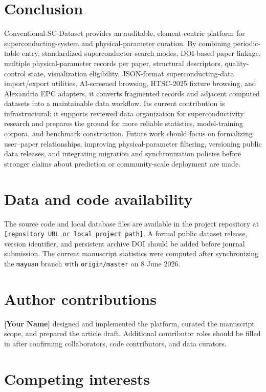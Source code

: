 \documentclass[11pt,a4paper]{article}
\begin{document}
\section{Conclusion}

Conventional-SC-Dataset provides an auditable, element-centric platform for superconducting-system and physical-parameter curation. By combining periodic-table entry, standardized superconductor-search modes, DOI-based paper linkage, multiple physical-parameter records per paper, structural descriptors, quality-control state, visualization eligibility, JSON-format superconducting-data import/export utilities, AI-screened browsing, HTSC-2025 fixture browsing, and Alexandria EPC adapters, it converts fragmented records and adjacent computed datasets into a maintainable data workflow. Its current contribution is infrastructural: it supports reviewed data organization for superconductivity research and prepares the ground for more reliable statistics, model-training corpora, and benchmark construction. Future work should focus on formalizing user--paper relationships, improving physical-parameter filtering, versioning public data releases, and integrating migration and synchronization policies before stronger claims about prediction or community-scale deployment are made.

\section*{Data and code availability}

The source code and local database files are available in the project repository at \texttt{[repository URL or local project path]}. A formal public dataset release, version identifier, and persistent archive DOI should be added before journal submission. The current manuscript statistics were computed after synchronizing the \texttt{mayuan} branch with \texttt{origin/master} on 8 June 2026.

\section*{Author contributions}

\textbf{[Your Name]} designed and implemented the platform, curated the manuscript scope, and prepared the article draft. Additional contributor roles should be filled in after confirming collaborators, code contributors, and data curators.

\section*{Competing interests}
\end{document}
